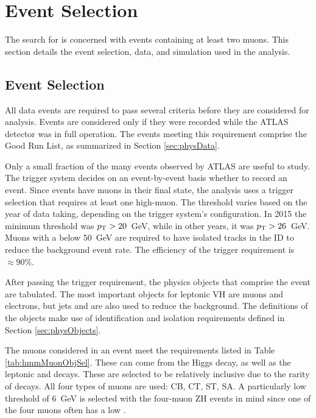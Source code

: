 \section{\hmm Event Selection}\label{sec:hmmEvSel}

The search for \hmm is concerned with events containing at least two muons.
This section details the event selection, data, and simulation used in the analysis.

\subsection{Event Selection}\label{sec:hmmEv}

All data events are required to pass several criteria before they are considered for analysis.
Events are considered only if they were recorded while the ATLAS detector was in full operation.
The events meeting this requirement comprise the Good Run List, as summarized in Section \ref{sec:physData}.

Only a small fraction of the many events observed by ATLAS are useful to study. 
The trigger system decides on an event-by-event basis whether to record an event. 
Since \hmm events have muons in their final state, the analysis uses a trigger selection that requires at least one high-\pt muon.
The \pt threshold varies based on the year of data taking, depending on the trigger system's configuration.
In 2015 the minimum threshold was $p_\text{T}>20$~GeV, while in other years, it was $p_\text{T}>26$~GeV.
Muons with a \pt below 50~GeV are required to have isolated tracks in the ID to reduce the background event rate.
The efficiency of the trigger requirement is $\approx90\%$.

After passing the trigger requirement, the physics objects that comprise the event are tabulated.
The most important objects for leptonic VH \hmm are muons and electrons, but jets and \met are also used to reduce the background.
The definitions of the objects make use of identification and isolation requirements defined in Section \ref{sec:physObjects}.

The muons considered in an event meet the requirements listed in Table \ref{tab:hmmMuonObjSel}.
These can come from the Higgs decay, as well as the leptonic \W and \Z decays.
These are selected to be relatively inclusive due to the rarity of \hmm decays.
All four types of muons are used: CB, CT, ST, SA.
A particularly low \pt threshold of 6~GeV is selected with the four-muon ZH events in mind since one of the four muons often has a low \pt.

